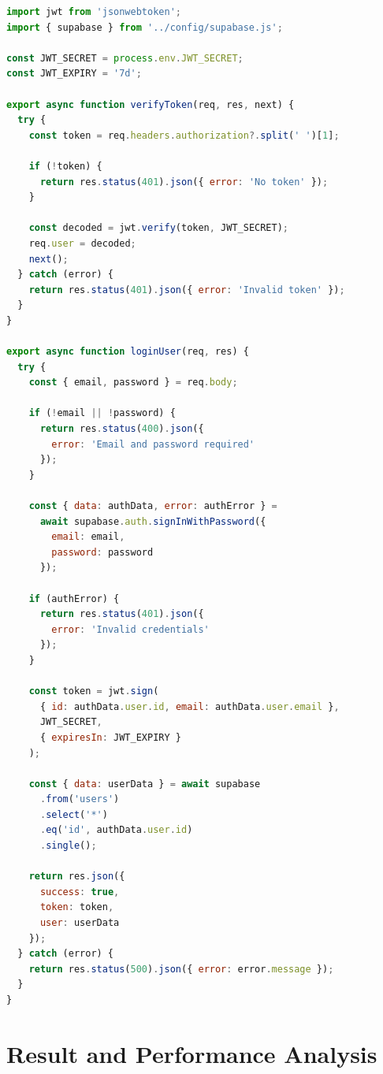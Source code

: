 \begin{lstlisting}[language=JavaScript, caption=Authentication Middleware and User Management, label=lst:auth]
import jwt from 'jsonwebtoken';
import { supabase } from '../config/supabase.js';

const JWT_SECRET = process.env.JWT_SECRET;
const JWT_EXPIRY = '7d';

export async function verifyToken(req, res, next) {
  try {
    const token = req.headers.authorization?.split(' ')[1];

    if (!token) {
      return res.status(401).json({ error: 'No token' });
    }

    const decoded = jwt.verify(token, JWT_SECRET);
    req.user = decoded;
    next();
  } catch (error) {
    return res.status(401).json({ error: 'Invalid token' });
  }
}

export async function loginUser(req, res) {
  try {
    const { email, password } = req.body;

    if (!email || !password) {
      return res.status(400).json({ 
        error: 'Email and password required' 
      });
    }

    const { data: authData, error: authError } = 
      await supabase.auth.signInWithPassword({
        email: email,
        password: password
      });

    if (authError) {
      return res.status(401).json({ 
        error: 'Invalid credentials' 
      });
    }

    const token = jwt.sign(
      { id: authData.user.id, email: authData.user.email },
      JWT_SECRET,
      { expiresIn: JWT_EXPIRY }
    );

    const { data: userData } = await supabase
      .from('users')
      .select('*')
      .eq('id', authData.user.id)
      .single();

    return res.json({
      success: true,
      token: token,
      user: userData
    });
  } catch (error) {
    return res.status(500).json({ error: error.message });
  }
}
\end{lstlisting}

\chapter{Result and Performance Analysis}

